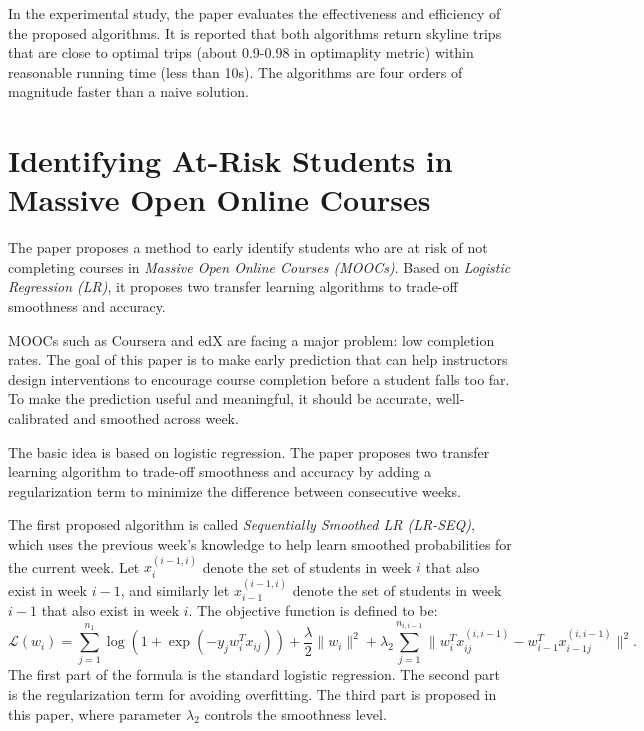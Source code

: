 \documentclass[paper=a4, fontsize=18pt]{article} %
\numberwithin{equation}{section} %
\numberwithin{figure}{section} %
\numberwithin{table}{section} %
\newcommand{\mL}{\mathcal{L}}
\begin{document}
In the experimental study, the paper evaluates the effectiveness and efficiency of the proposed algorithms. It is reported that both algorithms return skyline trips that are close to optimal trips (about 0.9-0.98 in optimaplity metric) within reasonable running time (less than 10s). The algorithms are four orders of magnitude faster than a naive solution.

\section{Identifying At-Risk Students in Massive Open Online Courses \cite{HBRZ15}}

The paper proposes a method to early identify students who are at risk of not completing courses in \emph{Massive Open Online Courses (MOOCs)}. Based on \emph{Logistic Regression (LR)}, it proposes two transfer learning algorithms to trade-off smoothness and accuracy.

MOOCs such as Coursera and edX are facing a major problem: low completion rates. The goal of this paper is to make early prediction that can help instructors design interventions to encourage course completion before a student falls too far. To make the prediction useful and meaningful, it should be accurate, well-calibrated and smoothed across week.

The basic idea is based on logistic regression. The paper proposes two transfer learning algorithm to trade-off smoothness and accuracy by adding a regularization term to minimize the difference between consecutive weeks.

The first proposed algorithm is called \emph{Sequentially Smoothed LR (LR-SEQ)}, which uses the previous week's knowledge to help learn smoothed probabilities for the current week. Let $x_i^{(i-1,i)}$ denote the set of students in week $i$ that also exist in week $i-1$, and similarly let $x_{i-1}^{(i-1,i)}$ denote the set of students in week $i-1$ that also exist in week $i$. The objective function is defined to be:
$$\mL(w_i) = \sum_{j=1}^{n_1} \log(1+\exp(-y_j w_i^T x_{ij})) + \frac{\lambda}{2} \| w_i \|^2 + \lambda_2 \sum_{j=1}^{n_{i,i-1}} \|w_i^T x_{ij}^{(i,i-1)} - w_{i-1}^T x_{i-1j}^{(i,i-1)}\|^2.$$
The first part of the formula is the standard logistic regression. The second part is the regularization term for avoiding overfitting. The third part is proposed in this paper, where parameter $\lambda_2$ controls the smoothness level.
\end{document}
